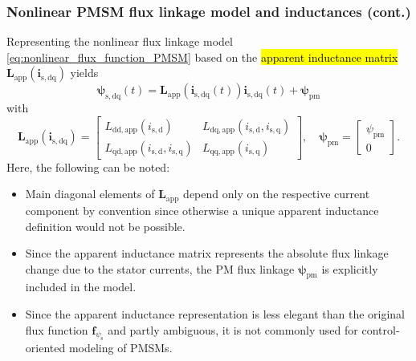\begin{frame}
    \frametitle{Nonlinear PMSM flux linkage model and inductances (cont.)}
    Representing the nonlinear flux linkage model \eqref{eq:nonlinear_flux_function_PMSM} based on the \hl{apparent inductance matrix} $\bm{L}_{\mathrm{app}}(\bm{i}_\mathrm{s,dq})$ yields
    \begin{equation}
        \bm{\psi}_\mathrm{s,dq}(t) = \bm{L}_{\mathrm{app}}(\bm{i}_\mathrm{s,dq}(t))\bm{i}_\mathrm{s,dq}(t) + \bm{\psi}_\mathrm{pm}
    \end{equation}\pause
    with
    \begin{equation}
        \bm{L}_{\mathrm{app}}(\bm{i}_\mathrm{s,dq}) = \begin{bmatrix}
            L_{\mathrm{dd,app}}(i_\mathrm{s,d})                 & L_{\mathrm{dq,app}}(i_\mathrm{s,d}, i_\mathrm{s,q}) \\[1.5ex]
            L_{\mathrm{qd,app}}(i_\mathrm{s,d}, i_\mathrm{s,q}) & L_{\mathrm{qq,app}}(i_\mathrm{s,q})
        \end{bmatrix}, \quad \bm{\psi}_\mathrm{pm} = \begin{bmatrix}
            \psi_\mathrm{pm} \\[1.5ex]
            0
        \end{bmatrix}.
    \end{equation}\pause
    Here, the following can be noted:
    \begin{itemize}
        \item Main diagonal elements of $\bm{L}_{\mathrm{app}}$ depend only on the respective current component by convention since otherwise a unique apparent inductance definition would not be possible.\pause
        \item Since the apparent inductance matrix represents the absolute flux linkage change due to the stator currents, the PM flux linkage $\bm{\psi}_\mathrm{pm}$ is explicitly included in the model.\pause
        \item Since the apparent inductance representation is less elegant than the original flux function $\bm{f}_{\psi_\mathrm{s}}$ and partly ambiguous, it is not commonly used for control-oriented modeling of PMSMs.
    \end{itemize}
\end{frame}

